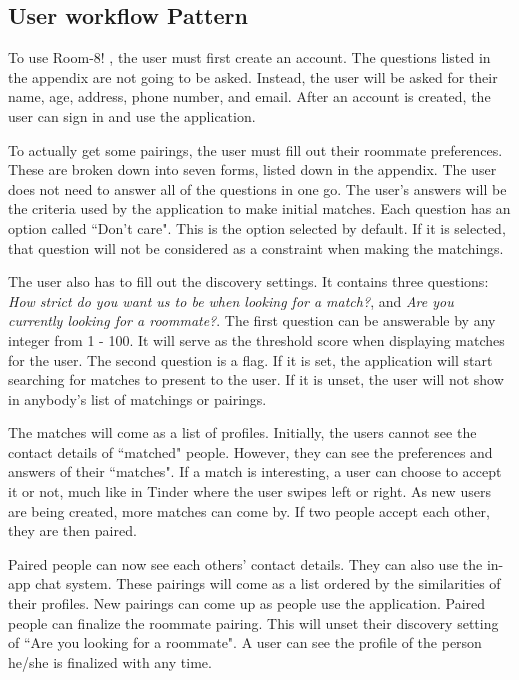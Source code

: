 \documentclass[journal]{./IEEE/IEEEtran}
\newcommand{\APPNAME}{Room-8! }
\begin{document}
\subsection{User workflow Pattern}

To use \APPNAME , the user must first create an account. The questions listed in the appendix are not going to be asked. Instead, the user will be asked for their name, age, address, phone number, and email. After an account is created, the user can sign in and use the application.

To actually get some pairings, the user must fill out their roommate preferences. These are broken down into seven forms, listed down in the appendix. The user does not need to answer all of the questions in one go. The user's answers will be the criteria used by the application to make initial matches. Each question has an option called ``Don't care". This is the option selected by default. If it is selected, that question will not be considered as a constraint when making the matchings.

The user also has to fill out the discovery settings. It contains three questions: \textit{How strict do you want us to be when looking for a match?}, and \textit{Are you currently looking for a roommate?}. The first question can be answerable by any integer from 1 - 100. It will serve as the threshold score when displaying matches for the user. The second question is a flag. If it is set, the application will start searching for matches to present to the user. If it is unset, the user will not show in anybody's list of matchings or pairings.

The matches will come as a list of profiles. Initially, the users cannot see the contact details of ``matched" people. However, they can see the preferences and answers of their ``matches". If a match is interesting, a user can choose to accept it or not, much like in Tinder where the user swipes left or right. As new users are being created, more matches can come by. If two people accept each other, they are then paired.

Paired people can now see each others' contact details. They can also use the in-app chat system. These pairings will come as a list ordered by the similarities of their profiles. New pairings can come up as people use the application. Paired people can finalize the roommate pairing. This will unset their discovery setting of ``Are you looking for a roommate". A user can see the profile of the person he/she is finalized with any time.
\end{document}
